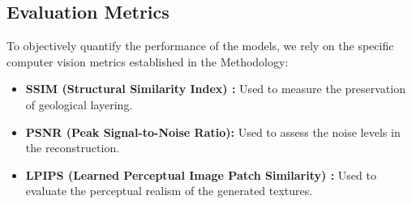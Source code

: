 \subsection{Evaluation Metrics}
To objectively quantify the performance of the models, we rely on the specific computer vision metrics established in the Methodology:
\begin{itemize}
    \item \textbf{SSIM (Structural Similarity Index) \cite{Wang_2004}:} Used to measure the preservation of geological layering.
    \item \textbf{PSNR (Peak Signal-to-Noise Ratio):} Used to assess the noise levels in the reconstruction.
    \item \textbf{LPIPS (Learned Perceptual Image Patch Similarity) \cite{Zhang_2018_CVPR}:} Used to evaluate the perceptual realism of the generated textures.
\end{itemize}

